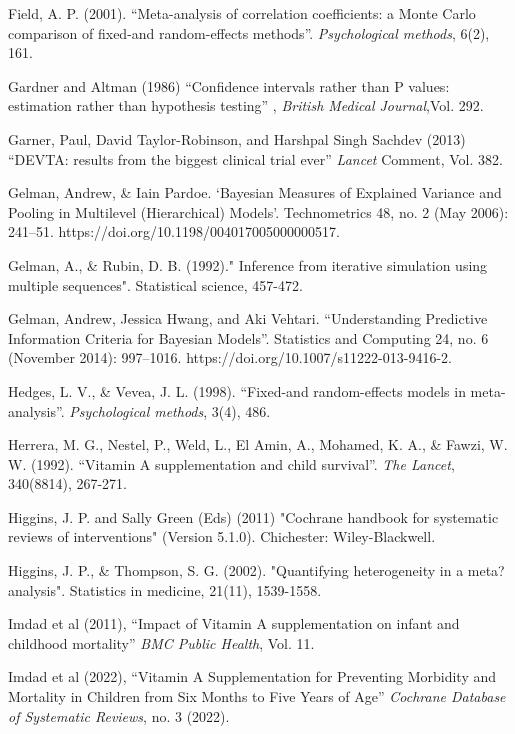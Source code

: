 \documentclass[12pt]{article}
\begin{document}
\begin{thebibliography}{99}
 Field, A. P. (2001). ``Meta-analysis of correlation coefficients: a Monte Carlo comparison of fixed-and random-effects methods''. \emph{Psychological methods}, 6(2), 161.

 Gardner and Altman (1986) ``Confidence intervals rather than P values: estimation rather than hypothesis testing'' , \emph{British Medical Journal},Vol. 292.

 Garner, Paul, David Taylor-Robinson, and Harshpal Singh Sachdev (2013) ``DEVTA: results from the biggest clinical trial ever'' \emph{Lancet} Comment, Vol. 382.

 Gelman, Andrew, \& Iain Pardoe. ‘Bayesian Measures of Explained Variance and Pooling in Multilevel (Hierarchical) Models’. Technometrics 48, no. 2 (May 2006): 241–51. https://doi.org/10.1198/004017005000000517.

 Gelman, A., \& Rubin, D. B. (1992)." Inference from iterative simulation using multiple sequences". Statistical science, 457-472.

 Gelman, Andrew, Jessica Hwang, and Aki Vehtari. ``Understanding Predictive Information Criteria for Bayesian Models''. Statistics and Computing 24, no. 6 (November 2014): 997–1016. https://doi.org/10.1007/s11222-013-9416-2.

 Hedges, L. V., \& Vevea, J. L. (1998). ``Fixed-and random-effects models in meta-analysis''. \emph{Psychological methods}, 3(4), 486.

 Herrera, M. G., Nestel, P., Weld, L., El Amin, A., Mohamed, K. A., \& Fawzi, W. W. (1992). ``Vitamin A supplementation and child survival''. \emph{The Lancet}, 340(8814), 267-271.

 Higgins, J. P. and Sally Green (Eds) (2011) "Cochrane handbook for systematic reviews of interventions" (Version 5.1.0). Chichester: Wiley-Blackwell.

 Higgins, J. P., \& Thompson, S. G. (2002). "Quantifying heterogeneity in a meta?analysis". Statistics in medicine, 21(11), 1539-1558.

 Imdad et al (2011), ``Impact of Vitamin A supplementation on infant and childhood mortality'' \emph{BMC Public Health}, Vol. 11.

 Imdad et al (2022), ``Vitamin A Supplementation for Preventing Morbidity and Mortality in Children from Six Months to Five Years of Age'' \emph{Cochrane Database of Systematic Reviews}, no. 3 (2022).


\end{thebibliography}
\end{document}
